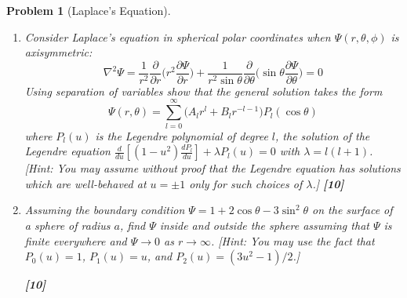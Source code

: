 \documentclass[a4paper]{article}
\theoremstyle{new}
\newtheorem{qns}{Problem}[section]
\begin{document}
\newpage
\begin{qns}[Laplace's Equation]\leavevmode
\begin{enumerate}[label=(\alph*)]
\item Consider Laplace’s equation in spherical polar coordinates when $\Psi(r,\theta,\phi)$ is axisymmetric:
$$\nabla^2\Psi=\frac{1}{r^2}\frac{\partial}{\partial r}\bigg(r^2\frac{\partial\Psi}{\partial r}\bigg)+\frac{1}{r^2\sin\theta}\frac{\partial}{\partial\theta}\bigg(\sin\theta\frac{\partial\Psi}{\partial\theta}\bigg)=0$$
Using separation of variables show that the general solution takes the form
$$\Psi(r,\theta)=\sum_{l=0}^\infty\bigg(A_lr^l+B_lr^{-l-1}\bigg)P_l(\cos\theta)$$
where $P_l(u)$ is the Legendre polynomial of degree $l$, the solution of the Legendre equation
$\frac{d}{du}[(1-u^2)\frac{dP_l}{du}]+\lambda P_l(u)=0$ with $\lambda=l(l+1)$. [Hint: You may assume without proof that the Legendre equation has solutions which are well-behaved at $u=\pm1$ only for such choices of $\lambda$.] \hfill\textbf{[10]}
\item Assuming the boundary condition $\Psi=1+2\cos\theta-3\sin^2\theta$ on the surface
of a sphere of radius $a$, find $\Psi$ inside and outside the sphere assuming that $\Psi$ is finite
everywhere and $\Psi\rightarrow 0$ as $r\rightarrow\infty$. [Hint: You may use the fact that $P_0(u) = 1$, $P_1(u) = u$, and $P_2(u) = (3u^2 − 1)/2$.]

\hfill\textbf{[10]}
\end{enumerate}
\end{qns}
\end{document}
